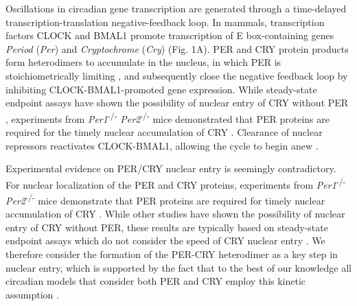 Oscillations in circadian gene transcription are generated through a
time-delayed transcription-translation negative-feedback loop. In mammals,
transcription factors CLOCK and BMAL1 promote transcription of E box-containing
genes {\it Period} ({\it Per}) and {\it Cryptochrome} ({\it Cry}) (Fig. 1A).
PER and CRY protein products form heterodimers to accumulate in the nucleus, in
which PER is stoichiometrically limiting \cite{Lee2001}, and subsequently close
the negative feedback loop by inhibiting CLOCK-BMAL1-promoted gene expression.
While steady-state endpoint assays have shown the possibility of nuclear entry
of CRY without PER \cite{Ye2011, Kume1999, Yagita2002}, experiments from {\it
Per1}\textsuperscript{-/-} {\it Per2}\textsuperscript{-/-} mice demonstrated
that PER proteins are required for the timely nuclear accumulation of CRY
\cite{Lee2001}.  Clearance of nuclear repressors reactivates CLOCK-BMAL1,
allowing the cycle to begin anew \cite{Takahashi2008}. 

Experimental evidence on PER/CRY nuclear entry is seemingly contradictory. For
nuclear localization of the PER and CRY proteins, experiments from {\it
Per1}\textsuperscript{-/-} {\it Per2}\textsuperscript{-/-} mice demonstrate
that PER proteins are required for timely nuclear accumulation of CRY
\cite{Lee2001}.  While other studies have shown the possibility of nuclear
entry of CRY without PER, these results are typically based on steady-state
endpoint assays which do not consider the speed of CRY nuclear entry
\cite{Ye2011, Kume1999, Yagita2002}. We therefore consider the formation of
the PER-CRY heterodimer as a key step in nuclear entry, which is supported by
the fact that to the best of our knowledge all circadian models that consider
both PER and CRY employ this kinetic assumption \cite{Hirota2012, Relogio2011,
Leloup2003, Forger2003, Mirsky2009}.

